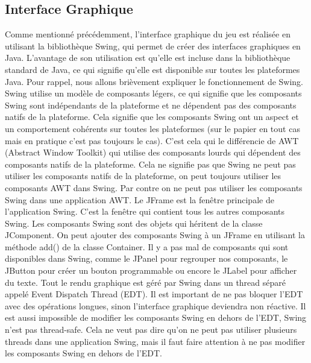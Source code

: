 \documentclass{article}
\begin{document}
    \subsection{Interface Graphique}\label{subsec:interface-graphique}

    Comme mentionné précédemment, l'interface graphique du jeu est réalisée en utilisant la bibliothèque Swing, qui permet de créer des interfaces graphiques en Java.
    L'avantage de son utilisation est qu'elle est incluse dans la bibliothèque standard de Java, ce qui signifie qu'elle est disponible sur toutes les plateformes Java.
    Pour rappel, nous allons brièvement expliquer le fonctionnement de Swing.
    \newline
    Swing utilise un modèle de composants légers, ce qui signifie que les composants Swing sont indépendants de la plateforme et ne dépendent pas des composants natifs de la plateforme.
    Cela signifie que les composants Swing ont un aspect et un comportement cohérents sur toutes les plateformes (sur le papier en tout cas mais en pratique c'est pas toujours le cas).
    C'est cela qui le différencie de AWT (Abstract Window Toolkit) qui utilise des composants lourds qui dépendent des composants natifs de la plateforme.
    Cela ne signifie pas que Swing ne peut pas utiliser les composants natifs de la plateforme, on peut toujours utiliser les composants AWT dans Swing.
    Par contre on ne peut pas utiliser les composants Swing dans une application AWT.
    Le JFrame est la fenêtre principale de l'application Swing. C'est la fenêtre qui contient tous les autres composants Swing.
    Les composants Swing sont des objets qui héritent de la classe JComponent.
    On peut ajouter des composants Swing à un JFrame en utilisant la méthode add() de la classe Container.
    Il y a pas mal de composants qui sont disponibles dans Swing, comme le JPanel pour regrouper nos composants, le JButton pour créer un bouton programmable ou encore le JLabel pour afficher du texte.
    \newline
    Tout le rendu graphique est géré par Swing dans un thread séparé appelé Event Dispatch Thread (EDT).
    Il est important de ne pas bloquer l'EDT avec des opérations longues, sinon l'interface graphique deviendra non réactive.
    Il est aussi impossible de modifier les composants Swing en dehors de l'EDT, Swing n'est pas thread-safe.
    Cela ne veut pas dire qu'on ne peut pas utiliser plusieurs threads dans une application Swing, mais il faut faire attention à ne pas modifier les composants Swing en dehors de l'EDT.
\end{document}
